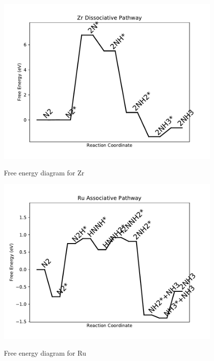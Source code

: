 \documentclass{article}
\begin{document}
\begin{figure}
\includegraphics[width=1\linewidth]{data/plots/Zr_dissociative.pdf}
\label{fig:Zr_dissociative}
\caption{Free energy diagram for Zr}
\end{figure}

\clearpage
\begin{figure}
\includegraphics[width=1\linewidth]{data/plots/Ru_associative.pdf}
\label{fig:Ru_associative}
\caption{Free energy diagram for Ru}
\end{figure}
\end{document}
